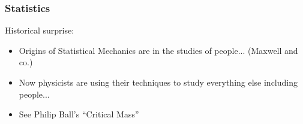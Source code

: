 \begin{frame}
  \frametitle{Statistics}

  \begin{block}{Historical surprise:}
  \begin{itemize}
  \item<1-> Origins of Statistical Mechanics are in the studies of people...
    (Maxwell and co.)
  \item<2-> Now physicists are using their techniques to study everything else
    including people...
  \item<3-> See Philip Ball's ``Critical Mass''\cite{ball2004a}
  \end{itemize}
  \end{block}

\end{frame}


